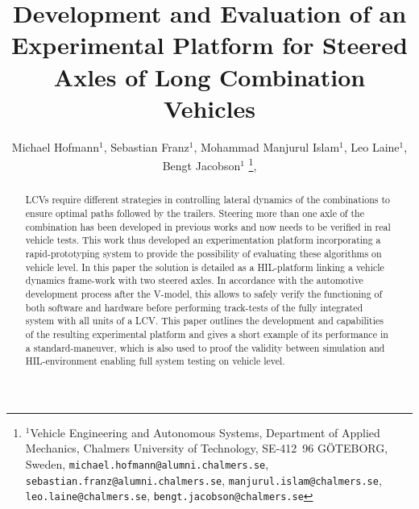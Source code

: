 \documentclass[letterpaper, 10pt, conference]{IEEEconf}      %
\title{\LARGE \bf
Development and Evaluation of an Experimental Platform for Steered Axles of Long Combination Vehicles}
\author{Michael Hofmann$^{1}$, Sebastian Franz$^{1}$, Mohammad Manjurul Islam$^{1}$, Leo Laine$^{1}$, Bengt Jacobson$^{1}$%
	\thanks{$^{1}$Vehicle Engineering and Autonomous Systems, Department of Applied Mechanics, Chalmers University of Technology, SE-412~96 G\"OTEBORG, Sweden,
		{\tt\small michael.hofmann@alumni.chalmers.se},
		{\tt\small sebastian.franz@alumni.chalmers.se},
		{\tt\small manjurul.islam@chalmers.se},
		{\tt\small leo.laine@chalmers.se},
		{\tt\small bengt.jacobson@chalmers.se}
		},
}
\begin{document}

\maketitle
\thispagestyle{empty}
\pagestyle{empty}


\begin{abstract}

	\glspl{LCV} require different strategies in controlling lateral dynamics of the combinations to ensure optimal paths followed by the trailers. Steering more than one axle of the combination has been developed in previous works and now needs to be verified in real vehicle tests. This work thus developed an experimentation platform incorporating a rapid-prototyping system to provide the possibility of evaluating these algorithms on vehicle level. In this paper the solution is detailed as a \gls{HIL}-platform linking a vehicle dynamics frame-work with two steered axles. In accordance with the automotive development process after the V-model, this allows to safely verify the functioning of both software and hardware before performing track-tests of the fully integrated system with all units of a \gls{LCV}. This paper outlines the development and capabilities of the resulting experimental platform and gives a short example of its performance in a standard-maneuver, which is also used to proof the validity between simulation and \gls{HIL}-environment enabling full system testing on vehicle level.

\end{abstract}








%



%





\addtolength{\textheight}{-12cm}   %



\printbibliography
\end{document}

